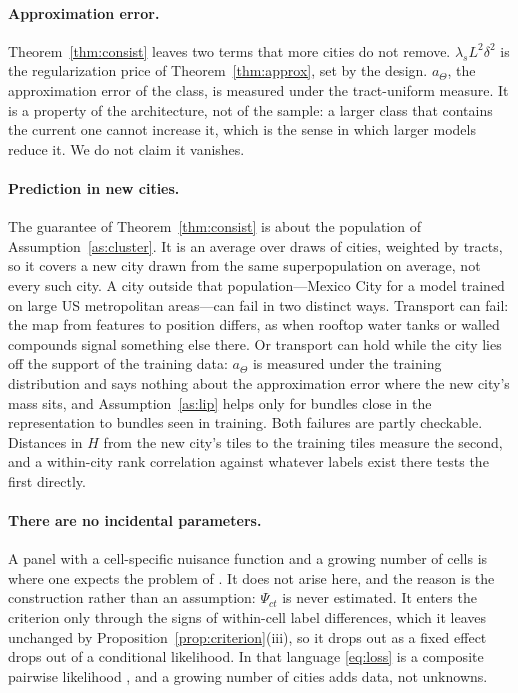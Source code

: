 \documentclass[11pt]{article}
\theoremstyle{remark}
\begin{document}
\paragraph{Approximation error.} Theorem~\ref{thm:consist} leaves two terms that more cities do not
remove. $\lambda_s L^2\delta^2$ is the regularization price of Theorem~\ref{thm:approx}, set by the
design. $a_\Theta$, the approximation error of the class, is measured under the tract-uniform measure.
It is a property of the architecture, not of the sample: a larger class that contains the current one
cannot increase it, which is the sense in which larger models reduce it. We do not claim it vanishes.

\paragraph{Prediction in new cities.} The guarantee of Theorem~\ref{thm:consist} is about the population
of Assumption~\ref{as:cluster}. It is an average over draws of cities, weighted by tracts, so it covers
a new city drawn from the same superpopulation on average, not every such city. A city outside that
population---Mexico City for a model trained on large US metropolitan areas---can fail in two distinct
ways. Transport can fail: the map from features to position differs, as when rooftop water tanks or
walled compounds signal something else there. Or transport can hold while the city lies off the support
of the training data: $a_\Theta$ is measured under the training distribution and says nothing about the
approximation error where the new city's mass sits, and Assumption~\ref{as:lip} helps only for bundles
close in the representation to bundles seen in training. Both failures are partly checkable. Distances in
$H$ from the new city's tiles to the training tiles measure the second, and a within-city rank
correlation against whatever labels exist there tests the first directly.

\paragraph{There are no incidental parameters.} A panel with a cell-specific nuisance function and a
growing number of cells is where one expects the problem of \citet{neyman1948}. It does not arise here,
and the reason is the construction rather than an assumption: $\Psi_{ct}$ is never estimated. It enters
the criterion only through the signs of within-cell label differences, which it leaves unchanged by
Proposition~\ref{prop:criterion}(iii), so it drops out as a fixed effect drops out of a conditional
likelihood. In that language \eqref{eq:loss} is a composite pairwise likelihood \citep{lindsay1988}, and
a growing number of cities adds data, not unknowns.
\end{document}
